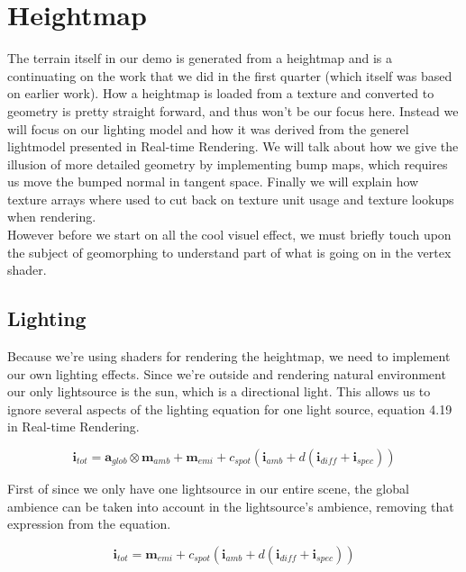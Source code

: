 \chapter{Heightmap}


The terrain itself in our demo is generated from a heightmap and is a
continuating on the work that we did in the first quarter (which
itself was based on earlier work). How a heightmap is loaded from a
texture and converted to geometry is pretty straight forward, and thus
won't be our focus here. Instead we will focus on our lighting model
and how it was derived from the generel lightmodel presented in
Real-time Rendering. We will talk about how we give the illusion of
more detailed geometry by implementing bump maps, which requires us
move the bumped normal in tangent space. Finally we will explain how
texture arrays where used to cut back on texture unit usage and
texture lookups when rendering.\\

However before we start on all the cool visuel effect, we must briefly
touch upon the subject of geomorphing to understand part of what is
going on in the vertex shader.\\



\section{Lighting}

Because we're using shaders for rendering the heightmap, we need to
implement our own lighting effects. Since we're outside and rendering
natural environment our only lightsource is the sun, which is a
directional light. This allows us to ignore several aspects of the
lighting equation for one light source, equation 4.19 in Real-time
Rendering. 

\begin{displaymath}
  \mathbf{i}_{tot} = \mathbf{a}_{glob} \otimes \mathbf{m}_{amb} +
  \mathbf{m}_{emi} + c_{spot}(\mathbf{i}_{amb} + d(\mathbf{i}_{diff} + \mathbf{i}_{spec}))
\end{displaymath}

First of since we only have one lightsource in our entire
scene, the global ambience can be taken into account in the
lightsource's ambience, removing that expression from the
equation.

\begin{displaymath}
  \mathbf{i}_{tot} = \mathbf{m}_{emi} + c_{spot}(\mathbf{i}_{amb} + d(\mathbf{i}_{diff} + \mathbf{i}_{spec}))
\end{displaymath}

